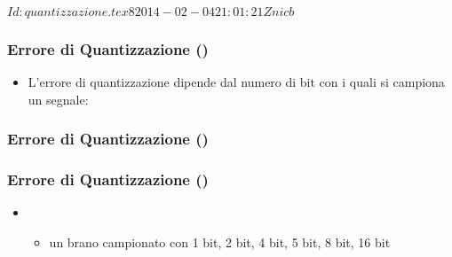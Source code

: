 %
%
%
%
\svnInfo $Id: quantizzazione.tex 8 2014-02-04 21:01:21Z nicb $

\setcounter{ms}{1}
\begin{frame}
    \frametitle{Errore di Quantizzazione ()}

	\begin{itemize}[<+- | alert@+->]

		\item L'errore di quantizzazione dipende
		      dal numero di bit con i quali si
			  campiona un segnale:

			  \begin{center}
			  \end{center}

	\end{itemize}

\end{frame}


\begin{frame}
    \frametitle{Errore di Quantizzazione ()}


			  \begin{center}
			  \end{center}


\end{frame}



\begin{frame}
    \frametitle{Errore di Quantizzazione ()}

	\begin{itemize}

		\item {}

		\begin{itemize}

			\item un brano campionato con 1 bit,
			      2 bit, 4 bit, 5 bit, 8 bit, 16 bit

				\begin{center}
				\end{center}

		\end{itemize}

	\end{itemize}

\end{frame}
